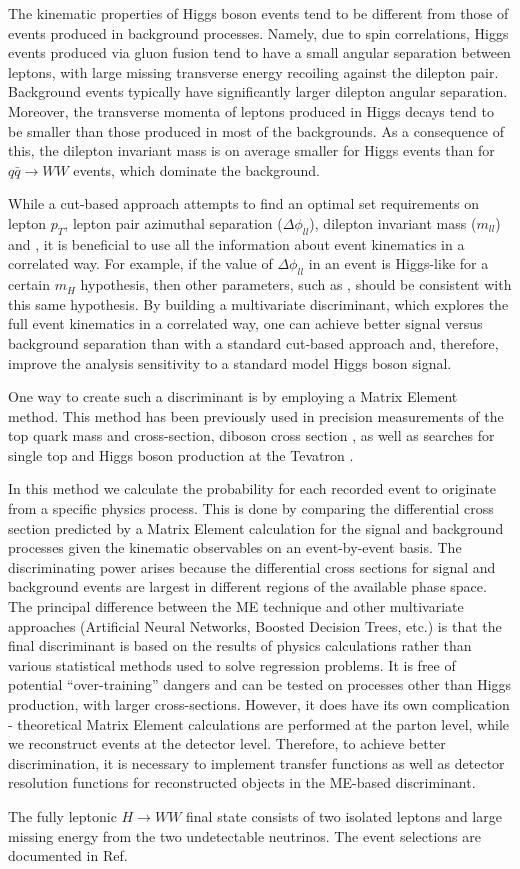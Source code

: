 The kinematic properties of Higgs boson events tend to be different from those of events produced in background processes.
Namely, due to spin correlations, Higgs events produced via gluon fusion tend to have a small angular separation between 
leptons, with large missing transverse energy recoiling against the dilepton pair. Background events typically have significantly
larger dilepton angular separation.  Moreover,  the transverse momenta of leptons produced in Higgs decays tend to be smaller
than those produced in most of the backgrounds. As a consequence of this, the dilepton invariant mass is on average smaller for Higgs events
than for $q\bar{q} \rightarrow WW$ events, which dominate the background.

While a cut-based approach attempts to find an optimal set requirements on lepton $p_{T}$, lepton pair azimuthal separation ($\Delta\phi_{ll}$), 
dilepton invariant mass  ($m_{ll}$) and \met, it is beneficial to use all the information about event kinematics in a correlated way. 
For example, if the value of $\Delta\phi_{ll}$ in an event is Higgs-like for a certain $m_{H}$ hypothesis, then other parameters, such as  
\met, should be consistent with this same hypothesis. By building a multivariate discriminant, which explores the full event kinematics
in a correlated way, one can achieve better signal versus background separation than with a standard cut-based approach and, 
therefore, improve the analysis sensitivity to a standard model Higgs boson signal.

One way to create such a discriminant is by employing a Matrix Element method. This method has been previously used in precision
measurements of the top quark mass \cite{ref:CDFTopMass,ref:D0TopMass} and cross-section, diboson cross section \cite{ref:CDFDiboson}, 
as well as searches for single top \cite{ref:CDFSingleTop,ref:D0SingleTop} and Higgs boson production at the Tevatron \cite{ref:CDFHiggs,ref:D0Higgs}.

In this method we calculate the probability for each recorded event to originate from a specific physics process.  
This is done by comparing the differential cross section predicted by a Matrix Element calculation for the signal and background processes given the kinematic observables
on an event-by-event basis. The discriminating power arises because the differential cross sections for signal and background
events are largest in different regions of the available phase space. The principal difference between the ME technique and other
multivariate approaches (Artificial Neural Networks, Boosted Decision Trees, etc.) is that the final discriminant is based on the results
of physics calculations rather than various statistical methods used to solve regression problems. It is free of potential ``over-training''
dangers and can be tested on processes other than Higgs production, with larger cross-sections. However, it does have its own complication - 
theoretical Matrix Element calculations are performed at the parton level, while we reconstruct events at the detector level. 
Therefore, to achieve better discrimination, it is necessary to implement transfer functions as well as detector resolution functions for
reconstructed objects in the ME-based discriminant.

The fully leptonic $H\rightarrow WW$ final state consists of two isolated leptons and large missing energy from the two undetectable neutrinos. 
The event selections are documented in Ref.~\cite{ref:HWW2011smurf}
